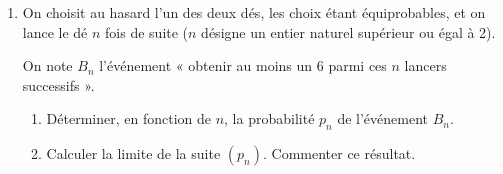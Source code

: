 \begin{enumerate}
\begin{enumerate}
     \end{enumerate}
     \item
     On choisit au hasard l'un des deux dés, les choix étant équiprobables, et on lance le dé $n$ fois de suite ($n$ désigne un entier naturel supérieur ou égal à 2).
     \par
     On note $B_{n}$ l'événement « obtenir au moins un 6 parmi ces $n$ lancers successifs ».
     \begin{enumerate}
          \item
          Déterminer, en fonction de $n$, la probabilité $p_{n}$ de l'événement $B_{n}$.
          \item
          Calculer la limite de la suite $\left(p_{n}\right)$. Commenter ce résultat.
     \end{enumerate}
\end{enumerate}
